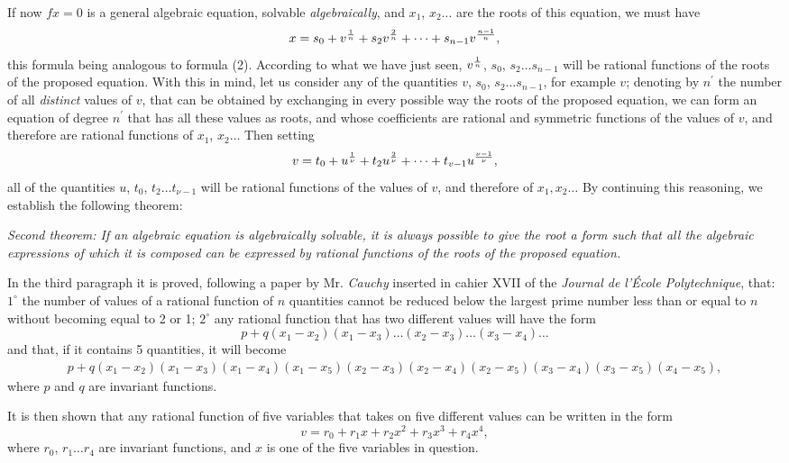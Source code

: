 \documentclass[oneside, 12 pt, leqno]{memoir}
\let\oldfrac\frac
\def\frac#1#2{\mathchoice{\text{\scalebox{.83}{${\oldfrac{#1}{#2}}$}}}{\text{\scalebox{.83}{${\displaystyle\oldfrac{#1}{#2}}$}}}{\genfrac{}{}{}{2}{#1}{#2}}{\genfrac{}{}{}{3}{#1}{#2}}}
\begin{document}
If now \(f x=0\) is a general algebraic equation, solvable \textit{algebraically}, and \(x_1\), \(x_2 \dots\) are the roots of this equation, we must have
\[x=s_0+v^{\frac{1}{n}}+s_2 v^{\frac{2}{n}}+\dots+s_{n-1} v^{\frac{n-1}{n}},\]
this formula being analogous to formula (2). According to what we have just seen, \(v^{\frac{1}{n}}\), \(s_0\), \(s_2 \dots s_{n-1}\) will be rational functions of the roots of the proposed equation. With this in mind, let us consider any of the quantities \(v\), \(s_0\), \(s_2 \dots s_{n-1}\), for example \(v\); denoting by \(n^{\prime}\) the number of all \textit{distinct} values of \(v\), that can be obtained by exchanging in every possible way the roots of the proposed equation, we can form an equation of degree \(n^{\prime}\) that has all these values as roots, and whose coefficients are rational and symmetric functions of the values of \(v\), and therefore are rational functions of \(x_1\), \(x_2 \dots\)  Then setting
\[v=t_0+u^{\frac{1}{\nu}}+t_2 u^{\frac{2}{\nu}}+\dots+t_{v-1} u^{\frac{\nu-1}{\nu}},\]
all of the quantities \(u\), \(t_0\), \(t_2 \dots t_{\nu-1}\) will be rational functions of the values of \(v\), and therefore of \(x_1, x_2 \dots\) By continuing this reasoning, we establish the following theorem:

\textit{Second theorem: If an algebraic equation is algebraically solvable, it is always possible to give the root a form such that all the algebraic expressions of which it is composed can be expressed by rational functions of the roots of the proposed equation.}

In the third paragraph it is proved, following a paper by Mr. \textit{Cauchy} inserted in cahier XVII of the \textit{Journal de l'École Polytechnique}, that: \(1^{\circ}\) the number of values of a rational function of \(n\) quantities cannot be reduced below the largest prime number less than or equal to \(n\) without becoming equal to 2 or 1; \(2^{\circ}\) any rational function that has two different values will have the form
\[p+q\left(x_1-x_2\right)\left(x_1-x_3\right) \dots\left(x_2-x_3\right) \dots\left(x_3-x_4\right) \dots\]
and that, if it contains 5 quantities, it will become
\[\begin{gathered}
p+q(x_1-x_2)(x_1-x_3)(x_1-x_4)(x_1-x_5)(x_2-x_3)(x_2-x_4)(x_2-x_5)(x_3-x_4)(x_3-x_5)(x_4-x_5),
\end{gathered}\]
where \(p\) and \(q\) are invariant functions.

It is then shown that any rational function of five variables that takes on five different values can be written in the form
\[v=r_0+r_1 x+r_2 x^2+r_3 x^3+r_4 x^4,\]
where \(r_0\), \(r_1 \dots r_4\) are invariant functions, and \(x\) is one of the five variables in question.
\end{document}
